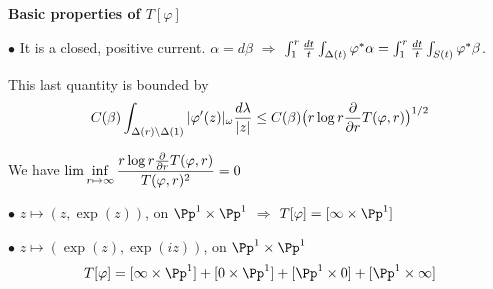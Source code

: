 \begin{slide}
\par\vspace{\bigskipamount}\noindent
{\large\bf Basic properties of $T[\varphi]$}

\par\vspace{\bigskipamount}\noindent
$\bullet$ It is a closed, positive current.
\vskip 5pt \hskip 0.3cm $\alpha= d\beta$ \hskip 0.3cm $\Longrightarrow$ \hskip 0.3cm
$\int_1^r{{dt}\over {t}}\int_{\Delta(t)}\varphi^*\alpha= 
\int_1^r{{dt}\over {t}}\int_{S(t)}\varphi^*\beta$.
\par\vspace{\bigskipamount}\noindent
\hskip 0.3cm This last quantity is bounded by
$$C(\beta)\int_{\Delta(r)\setminus \Delta(1)}\vert \varphi^\prime (z)\vert _\omega
{{d\lambda}\over {\vert z \vert }}\leq C(\beta)\bigl( r\log r{{\partial}\over{\partial r}}T(\varphi, r)
\bigr)^{1/2}$$

\hskip 0.3cm We have \hskip 0.3cm $\displaystyle 
\lim\inf_{r\mapsto \infty} {{r\log r{{\partial}\over{\partial r}}T(\varphi, r)}\over {T(\varphi, r)^2}}= 0$

\par\vspace{\bigskipamount}\noindent
{}

$\bullet$ $z\mapsto (z, \exp(z))$, on ${\Pp}^1 \times{\Pp}^1$ 
\hskip 0.3cm $\Longrightarrow$  \hskip 0.3cm
$T[\varphi]= [\infty\times {\Pp}^1]$

$\bullet$ $z\mapsto (\exp(z), \exp(iz))$, on ${\Pp}^1\times{\Pp}^1$ 
$$T[\varphi]= [\infty\times {\Pp}^1]+ [0\times {\Pp}^1]+ [{\Pp}^1\times 0]+ [{\Pp}^1\times \infty]$$

\end{slide}

